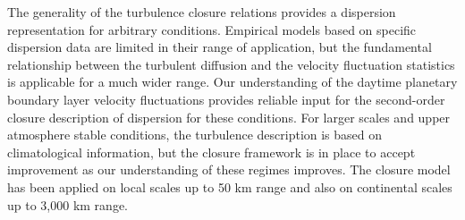 The generality of the turbulence closure relations provides a dispersion representation for arbitrary conditions.  Empirical models based on specific dispersion data are limited in their range of application, but the fundamental relationship between the turbulent diffusion and the velocity fluctuation statistics is applicable for a much wider range.  Our understanding of the daytime planetary boundary layer velocity fluctuations provides reliable input for the second-order closure description of dispersion for these conditions. For larger scales and upper atmosphere stable conditions, the turbulence description is based on climatological information, but the closure framework is in place to accept improvement as our understanding of these regimes improves. The closure model has been applied on local scales up to 50 km range and also on continental scales up to 3,000 km range.\\

